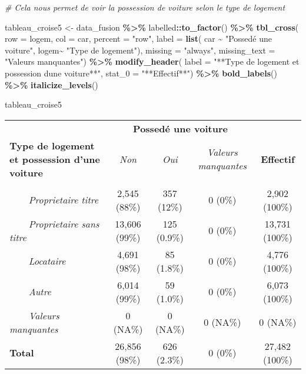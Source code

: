 \documentclass[
]{article}
\newenvironment{Shaded}{\begin{snugshade}}{\end{snugshade}}
\newcommand{\AttributeTok}[1]{\textcolor[rgb]{0.13,0.29,0.53}{#1}}
\newcommand{\CommentTok}[1]{\textcolor[rgb]{0.56,0.35,0.01}{\textit{#1}}}
\newcommand{\FunctionTok}[1]{\textcolor[rgb]{0.13,0.29,0.53}{\textbf{#1}}}
\newcommand{\NormalTok}[1]{#1}
\newcommand{\OtherTok}[1]{\textcolor[rgb]{0.56,0.35,0.01}{#1}}
\newcommand{\SpecialCharTok}[1]{\textcolor[rgb]{0.81,0.36,0.00}{\textbf{#1}}}
\newcommand{\StringTok}[1]{\textcolor[rgb]{0.31,0.60,0.02}{#1}}
\begin{document}
\begin{Shaded}
\begin{Highlighting}[]
\CommentTok{\# Cela nous permet de voir la possession de voiture selon le type de logement}

\NormalTok{tableau\_croise5 }\OtherTok{\textless{}{-}}\NormalTok{ data\_fusion }\SpecialCharTok{\%\textgreater{}\%}
\NormalTok{  labelled}\SpecialCharTok{::}\FunctionTok{to\_factor}\NormalTok{() }\SpecialCharTok{\%\textgreater{}\%}  
  \FunctionTok{tbl\_cross}\NormalTok{(}
    \AttributeTok{row =}\NormalTok{ logem,  }
    \AttributeTok{col =}\NormalTok{ car,  }
    \AttributeTok{percent =} \StringTok{"row"}\NormalTok{,  }
    \AttributeTok{label =} \FunctionTok{list}\NormalTok{(}
\NormalTok{      car }\SpecialCharTok{\textasciitilde{}} \StringTok{"Possedé une voiture"}\NormalTok{,  }
\NormalTok{      logem}\SpecialCharTok{\textasciitilde{}} \StringTok{"Type de logement"}\NormalTok{),}
    \AttributeTok{missing =} \StringTok{"always"}\NormalTok{,  }
    \AttributeTok{missing\_text =} \StringTok{"Valeurs manquantes"}\NormalTok{) }\SpecialCharTok{\%\textgreater{}\%}
  \FunctionTok{modify\_header}\NormalTok{(}
    \AttributeTok{label =} \StringTok{"**Type de logement et possession d\textquotesingle{}une voiture**"}\NormalTok{,}
    \AttributeTok{stat\_0 =} \StringTok{"**Effectif**"}\NormalTok{) }\SpecialCharTok{\%\textgreater{}\%}
  \FunctionTok{bold\_labels}\NormalTok{() }\SpecialCharTok{\%\textgreater{}\%}  
  \FunctionTok{italicize\_levels}\NormalTok{()}

\NormalTok{tableau\_croise5}
\end{Highlighting}
\end{Shaded}

\begin{table}[!t]
\fontsize{12.0pt}{14.4pt}\selectfont
\begin{tabular*}{\linewidth}{@{\extracolsep{\fill}}lcccc}
\toprule
 & \multicolumn{3}{c}{\textbf{Possedé une voiture}} &  \\ 
\cmidrule(lr){2-4}
\textbf{Type de logement et possession d'une voiture} & \emph{Non} & \emph{Oui} & \emph{Valeurs manquantes} & \textbf{Effectif} \\ 
\midrule\addlinespace[2.5pt]
{\bfseries Type de logement} &  &  &  &  \\ 
{\itshape     Proprietaire titre} & 2,545 (88\%) & 357 (12\%) & 0 (0\%) & 2,902 (100\%) \\ 
{\itshape     Proprietaire sans titre} & 13,606 (99\%) & 125 (0.9\%) & 0 (0\%) & 13,731 (100\%) \\ 
{\itshape     Locataire} & 4,691 (98\%) & 85 (1.8\%) & 0 (0\%) & 4,776 (100\%) \\ 
{\itshape     Autre} & 6,014 (99\%) & 59 (1.0\%) & 0 (0\%) & 6,073 (100\%) \\ 
{\itshape     Valeurs manquantes} & 0 (NA\%) & 0 (NA\%) & 0 (NA\%) & 0 (NA\%) \\ 
{\bfseries Total} & 26,856 (98\%) & 626 (2.3\%) & 0 (0\%) & 27,482 (100\%) \\ 
\bottomrule
\end{tabular*}
\end{table}
\end{document}
